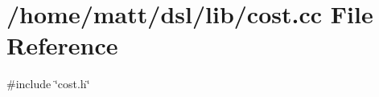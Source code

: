 \section{/home/matt/dsl/lib/cost.cc \-File \-Reference}
\label{cost_8cc}
{\ttfamily \#include \char`\"{}cost.\-h\char`\"{}}\*
